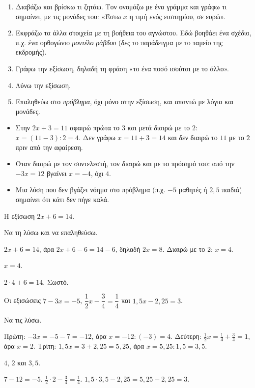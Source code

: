 
\begin{enumerate}[leftmargin=1.6em,itemsep=0.3ex,topsep=2pt]
\item Διαβάζω και βρίσκω τι ζητάω. Τον ονομάζω με ένα γράμμα και γράφω τι σημαίνει, με τις μονάδες του: «Έστω $x$ η τιμή ενός εισιτηρίου, σε ευρώ».
\item Εκφράζω τα άλλα στοιχεία με τη βοήθεια του αγνώστου. Εδώ βοηθάει ένα σχέδιο, π.χ. ένα ορθογώνιο \emph{μοντέλο ράβδου} (δες το παράδειγμα με το ταμείο της εκδρομής).
\item Γράφω την εξίσωση, δηλαδή τη φράση «το ένα ποσό ισούται με το άλλο».
\item Λύνω την εξίσωση.
\item Επαληθεύω στο \emph{πρόβλημα}, όχι μόνο στην εξίσωση, και απαντώ με λόγια και μονάδες.
\end{enumerate}

\begin{prosoxi}
\begin{itemize}[leftmargin=1.2em,itemsep=0.3ex,topsep=2pt]
\item Στην $2x+3=11$ αφαιρώ πρώτα το $3$ και μετά διαιρώ με το $2$: $x=(11-3):2=4$. Δεν γράφω $x=11+3=14$ και δεν διαιρώ το $11$ με το $2$ πριν από την αφαίρεση.
\item Όταν διαιρώ με τον συντελεστή, τον διαιρώ και με το πρόσημό του: από την $-3x=12$ βγαίνει $x=-4$, όχι $4$.
\item Μια λύση που δεν βγάζει νόημα στο πρόβλημα (π.χ. $-5$ μαθητές ή $2{,}5$ παιδιά) σημαίνει ότι κάτι δεν πήγε καλά.
\end{itemize}
\end{prosoxi}


\tixero Η εξίσωση $2x+6=14$.\par
\tithelo Να τη λύσω και να επαληθεύσω.\par
\possindeo $2x+6=14$, άρα $2x+6-6=14-6$, δηλαδή $2x=8$. Διαιρώ με το $2$: $x=4$.\par
\apantisi $x=4$.\par
\elegxos $2\cdot4+6=14$. Σωστό.

\tixero Οι εξισώσεις $7-3x=-5$, $\dfrac{1}{2}x-\dfrac{3}{4}=\dfrac{1}{4}$ και $1{,}5x-2{,}25=3$.\par
\tithelo Να τις λύσω.\par
\possindeo Πρώτη: $-3x=-5-7=-12$, άρα $x=-12:(-3)=4$. Δεύτερη: $\frac{1}{2}x=\frac{1}{4}+\frac{3}{4}=1$, άρα $x=2$. Τρίτη: $1{,}5x=3+2{,}25=5{,}25$, άρα $x=5{,}25:1{,}5=3{,}5$.\par
\apantisi $4$, $2$ και $3{,}5$.\par
\elegxos $7-12=-5$. $\frac{1}{2}\cdot2-\frac{3}{4}=\frac{1}{4}$. $1{,}5\cdot3{,}5-2{,}25=5{,}25-2{,}25=3$.

